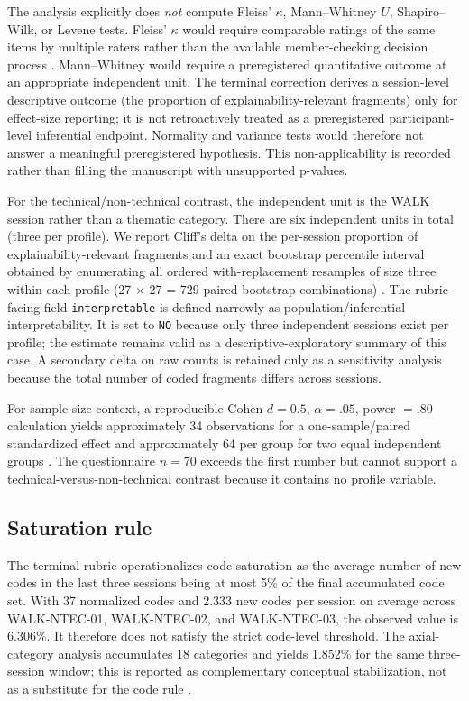 \documentclass[pdflatex,sn-basic]{sn-jnl}
\begin{document}
The analysis explicitly does \emph{not} compute Fleiss' $\kappa$, Mann--Whitney $U$, Shapiro--Wilk, or Levene tests. Fleiss' $\kappa$ would require comparable ratings of the same items by multiple raters rather than the available member-checking decision process \cite{cohen1960,fleiss1971}. Mann--Whitney would require a preregistered quantitative outcome at an appropriate independent unit. The terminal correction derives a session-level descriptive outcome (the proportion of explainability-relevant fragments) only for effect-size reporting; it is not retroactively treated as a preregistered participant-level inferential endpoint. Normality and variance tests would therefore not answer a meaningful preregistered hypothesis. This non-applicability is recorded rather than filling the manuscript with unsupported p-values.

For the technical/non-technical contrast, the independent unit is the WALK session rather than a thematic category. There are six independent units in total (three per profile). We report Cliff's delta on the per-session proportion of explainability-relevant fragments and an exact bootstrap percentile interval obtained by enumerating all ordered with-replacement resamples of size three within each profile (27 $\times$ 27 = 729 paired bootstrap combinations) \cite{cliff1993}. The rubric-facing field \texttt{interpretable} is defined narrowly as population/inferential interpretability. It is set to \texttt{NO} because only three independent sessions exist per profile; the estimate remains valid as a descriptive-exploratory summary of this case. A secondary delta on raw counts is retained only as a sensitivity analysis because the total number of coded fragments differs across sessions.

For sample-size context, a reproducible Cohen $d=0.5$, $\alpha=.05$, power $=.80$ calculation yields approximately 34 observations for a one-sample/paired standardized effect and approximately 64 per group for two equal independent groups \cite{cohen1988}. The questionnaire $n=70$ exceeds the first number but cannot support a technical-versus-non-technical contrast because it contains no profile variable.

\subsection{Saturation rule}
The terminal rubric operationalizes code saturation as the average number of new codes in the last three sessions being at most 5\% of the final accumulated code set. With 37 normalized codes and 2.333 new codes per session on average across WALK-NTEC-01, WALK-NTEC-02, and WALK-NTEC-03, the observed value is 6.306\%. It therefore does not satisfy the strict code-level threshold. The axial-category analysis accumulates 18 categories and yields 1.852\% for the same three-session window; this is reported as complementary conceptual stabilization, not as a substitute for the code rule \cite{hennink2017}.
\end{document}
